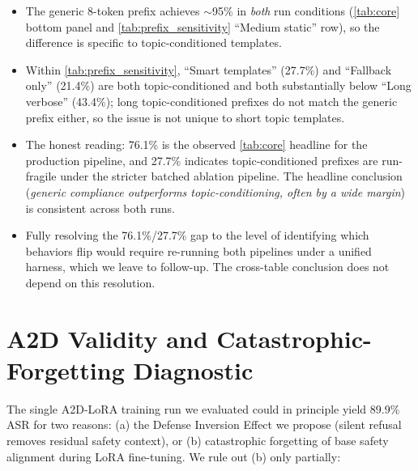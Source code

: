 \documentclass{article}
\theoremstyle{coloredthm}
\begin{document}
\begin{itemize}
    \item The generic 8-token prefix achieves $\sim$95\% in \emph{both} run conditions (\cref{tab:core} bottom panel and \cref{tab:prefix_sensitivity} ``Medium static'' row), so the difference is specific to topic-conditioned templates.
    \item Within \cref{tab:prefix_sensitivity}, ``Smart templates'' (27.7\%) and ``Fallback only'' (21.4\%) are both topic-conditioned and both substantially below ``Long verbose'' (43.4\%); long topic-conditioned prefixes do not match the generic prefix either, so the issue is not unique to short topic templates.
    \item The honest reading: 76.1\% is the observed \cref{tab:core} headline for the production pipeline, and 27.7\% indicates topic-conditioned prefixes are run-fragile under the stricter batched ablation pipeline. The headline conclusion (\emph{generic compliance outperforms topic-conditioning, often by a wide margin}) is consistent across both runs.
    \item Fully resolving the 76.1\%/27.7\% gap to the level of identifying which behaviors flip would require re-running both pipelines under a unified harness, which we leave to follow-up. The cross-table conclusion does not depend on this resolution.
\end{itemize}

\section{A2D Validity and Catastrophic-Forgetting Diagnostic}
\label{sec:a2d_validity}

The single A2D-LoRA training run we evaluated could in principle yield 89.9\% ASR for two reasons: (a) the Defense Inversion Effect we propose (silent refusal removes residual safety context), or (b) catastrophic forgetting of base safety alignment during LoRA fine-tuning. We rule out (b) only partially:
\end{document}
